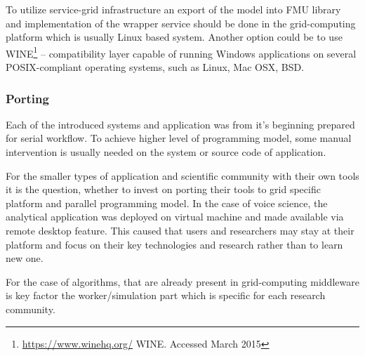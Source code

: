 To utilize service-grid infrastructure an export of the model into FMU library and implementation of the wrapper service should be done in the grid-computing platform which is usually Linux based system. Another option could be to use WINE\footnote{\url{https://www.winehq.org/} WINE. Accessed March 2015} -- compatibility layer capable of running Windows applications on several POSIX-compliant operating systems, such as Linux, Mac OSX, BSD. 


\subsubsection{Porting}
Each of the introduced systems and application was from it's beginning prepared for serial workflow. To achieve higher level of programming model,  some manual intervention is usually needed on the system or source code of application.

For the smaller types of application and scientific community with their own tools it is the question, whether to invest on porting their tools to grid specific platform and parallel programming model. In the case of voice science, the analytical application was deployed on virtual machine and made available via remote desktop feature. This caused that users and researchers may stay at their platform and focus on their key technologies and research rather than to learn new one.

For the case of algorithms, that are already present in grid-computing middleware is key factor the worker/simulation part which is specific for each research community. 





